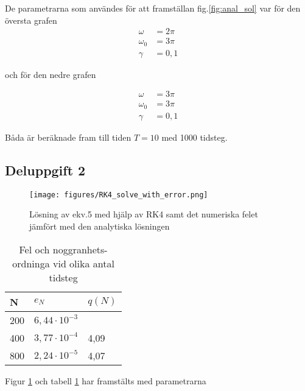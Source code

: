 \documentclass[12pt]{article}
\begin{document}
De parametrarna som användes för att framställan fig.\ref{fig:anal_sol} var för den översta grafen
\begin{align*}
    \omega &= 2 \pi\\
    \omega_0 &= 3 \pi\\
    \gamma &= 0,1
\end{align*}

och för den nedre grafen

\begin{align*}
    \omega &= 3 \pi\\
    \omega_0 &= 3 \pi\\
    \gamma &= 0,1
\end{align*}

Båda är beräknade fram till tiden $T = 10$ med 1000 tidsteg.

\subsection{Deluppgift 2}
\begin{figure}[H]
    \begin{small}
        \begin{center}
            \texttt{[image: figures/RK4\_solve\_with\_error.png]}
        \end{center}
        \caption{Lösning av ekv.5 med hjälp av RK4 samt det numeriska felet jämfört med den analytiska lösningen}
        \label{fig:RK4 with error}
    \end{small}
\end{figure}

\begin{table}[H]
    \caption{Fel och noggranhets-ordninga vid olika antal tidsteg}
    \label{tab:e-q}
    \begin{center}
        \begin{tabular}{lll}
            \hline
            N   & $e_N$ & $q(N)$ \\
            \hline
            200 & $6,44 \cdot 10^{-3}$    &     \\
            400 & $3,77 \cdot 10^{-4}$    & 4,09    \\
            800 & $2,24 \cdot 10^{-5}$    & 4,07   \\
            \hline 
        \end{tabular}
    \end{center}
\end{table}

Figur \ref{fig:RK4 with error} och tabell \ref{tab:e-q} har framstälts med parametrarna
\end{document}
